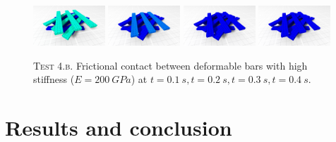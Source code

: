 \documentclass[AMA,STIX1COL]{WileyNJD-v2}
\begin{document}
\begin{figure}[!tbp]
  \centering
	\includegraphics[width=0.24\textwidth]{pics/ribbons_2_20.png}
  \includegraphics[width=0.24\textwidth]{pics/ribbons_2_40.png}
	\includegraphics[width=0.24\textwidth]{pics/ribbons_2_60.png}
	\includegraphics[width=0.24\textwidth]{pics/ribbons_2_80.png}
	\hfill
  \caption{\textsc{Test 4.b}. Frictional contact between deformable bars with high stiffness ($E=\SI{200}{GPa}$) at $t=\SI{0.1}{s},t=\SI{0.2}{s},t=\SI{0.3}{s},t=\SI{0.4}{s}$.}
	\label{fig:ribbons_2}
\end{figure}



%




\section{Results and conclusion}
\end{document}
